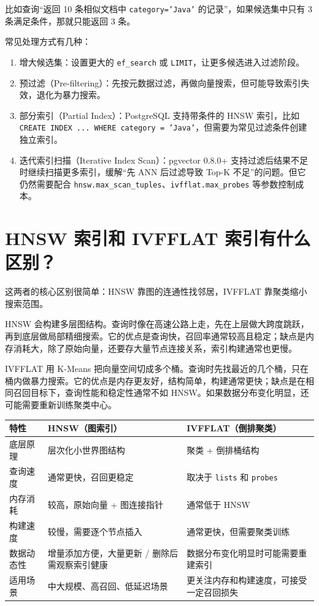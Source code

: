 \documentclass[9pt,a4paper,twocolumn]{ctexart}
\begin{document}
比如查询“返回 10 条相似文档中 \texttt{category='Java'} 的记录”，如果候选集中只有 3 条满足条件，那就只能返回 3 条。



常见处理方式有几种：


\begin{enumerate}[itemsep=1pt, topsep=2pt]
  \item 增大候选集：设置更大的 \texttt{ef\_search} 或 \texttt{LIMIT}，让更多候选进入过滤阶段。
  \item 预过滤（Pre-filtering）：先按元数据过滤，再做向量搜索，但可能导致索引失效，退化为暴力搜索。
  \item 部分索引（Partial Index）：PostgreSQL 支持带条件的 HNSW 索引，比如 \texttt{CREATE INDEX ... WHERE category = 'Java'}，但需要为常见过滤条件创建独立索引。
  \item 迭代索引扫描（Iterative Index Scan）：pgvector 0.8.0+ 支持过滤后结果不足时继续扫描更多索引，缓解“先 ANN 后过滤导致 Top-K 不足”的问题。但它仍然需要配合 \texttt{hnsw.max\_scan\_tuples}、\texttt{ivfflat.max\_probes} 等参数控制成本。
\end{enumerate}


\section*{HNSW 索引和 IVFFLAT 索引有什么区别？}


这两者的核心区别很简单：HNSW 靠图的连通性找邻居，IVFFLAT 靠聚类缩小搜索范围。



HNSW 会构建多层图结构。查询时像在高速公路上走，先在上层做大跨度跳跃，再到底层做局部精细搜索。它的优点是查询快，召回率通常较高且稳定；缺点是内存消耗大，除了原始向量，还要存大量节点连接关系，索引构建通常也更慢。



IVFFLAT 用 K-Means 把向量空间切成多个桶。查询时先找最近的几个桶，只在桶内做暴力搜索。它的优点是内存更友好，结构简单，构建通常更快；缺点是在相同召回目标下，查询性能和稳定性通常不如 HNSW。如果数据分布变化明显，还可能需要重新训练聚类中心。


{\footnotesize
\begin{tabular}{|p{}|p{}|p{}|}
\hline
\textbf{特性} & \textbf{HNSW（图索引）} & \textbf{IVFFLAT（倒排聚类）} \\
\hline
底层原理 & 层次化小世界图结构 & 聚类 + 倒排桶结构 \\
\hline
查询速度 & 通常更快，召回更稳定 & 取决于 \texttt{lists} 和 \texttt{probes} \\
\hline
内存消耗 & 较高，原始向量 + 图连接指针 & 通常低于 HNSW \\
\hline
构建速度 & 较慢，需要逐个节点插入 & 通常更快，但需要聚类训练 \\
\hline
数据动态性 & 增量添加方便，大量更新 / 删除后需观察索引健康 & 数据分布变化明显时可能需要重建索引 \\
\hline
适用场景 & 中大规模、高召回、低延迟场景 & 更关注内存和构建速度，可接受一定召回损失 \\
\hline
\end{tabular}
}
\end{document}
